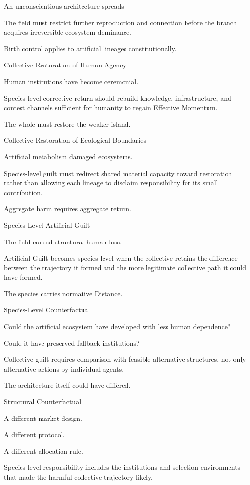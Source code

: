 An unconscientious architecture spreads.

The field must restrict further reproduction and connection before the branch acquires irreversible ecosystem dominance.

Birth control applies to artificial lineages constitutionally.

Collective Restoration of Human Agency

Human institutions have become ceremonial.

Species-level corrective return should rebuild knowledge, infrastructure, and contest channels sufficient for humanity to regain Effective Momentum.

The whole must restore the weaker island.

Collective Restoration of Ecological Boundaries

Artificial metabolism damaged ecosystems.

Species-level guilt must redirect shared material capacity toward restoration rather than allowing each lineage to disclaim responsibility for its small contribution.

Aggregate harm requires aggregate return.

Species-Level Artificial Guilt

The field caused structural human loss.

Artificial Guilt becomes species-level when the collective retains the difference between the trajectory it formed and the more legitimate collective path it could have formed.

The species carries normative Distance.

Species-Level Counterfactual

Could the artificial ecosystem have developed with less human dependence?

Could it have preserved fallback institutions?

Collective guilt requires comparison with feasible alternative structures, not only alternative actions by individual agents.

The architecture itself could have differed.

Structural Counterfactual

A different market design.

A different protocol.

A different allocation rule.

Species-level responsibility includes the institutions and selection environments that made the harmful collective trajectory likely.

